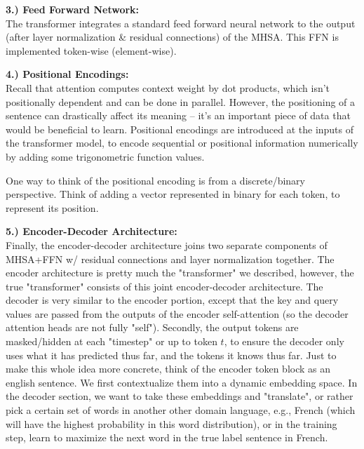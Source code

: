 \documentclass[11pt]{article}
\begin{document}
\textbf{3.) Feed Forward Network:}\\

The transformer integrates a standard feed forward neural network to the output (after layer normalization \& residual connections) of the MHSA. This FFN is implemented token-wise (element-wise).

\textbf{4.) Positional Encodings:}\\

Recall that attention computes context weight by dot products, which isn't positionally dependent and can be done in parallel. However, the positioning of a sentence can drastically affect its meaning -- it's an important piece of data that would be beneficial to learn. Positional encodings are introduced at the inputs of the transformer model, to encode sequential or positional information numerically by adding some trigonometric function values.

One way to think of the positional encoding is from a discrete/binary perspective. Think of adding a vector represented in binary for each token, to represent its position. 

\textbf{5.) Encoder-Decoder Architecture:}\\

Finally, the encoder-decoder architecture joins two separate components of MHSA+FFN w/ residual connections and layer normalization together. The encoder architecture is pretty much the "transformer" we described, however, the true "transformer" consists of this joint encoder-decoder architecture. The decoder is very similar to the encoder portion, except that the key and query values are passed from the outputs of the encoder self-attention (so the decoder attention heads are not fully "self"). Secondly, the output tokens are masked/hidden at each "timestep" or up to token $t$, to ensure the decoder only uses what it has predicted thus far, and the tokens it knows thus far. Just to make this whole idea more concrete, think of the encoder token block as an english sentence. We first contextualize them into a dynamic embedding space. In the decoder section, we want to take these embeddings and "translate", or rather pick a certain set of words in another other domain language, e.g., French (which will have the highest probability in this word distribution), or in the training step, learn to maximize the next word in the true label sentence in French.
\end{document}
